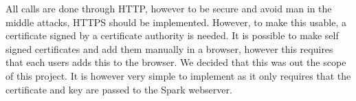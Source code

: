 \documentclass[12pt]{report}
\begin{document}
All calls are done through HTTP, however to be secure and avoid man in the middle attacks, HTTPS should be implemented. However, to make this usable, a certificate signed by a certificate authority is needed. It is possible to make self signed certificates and add them manually in a browser, however this requires that each users adds this to the browser. We decided that this was out the scope of this project. It is however very simple to implement as it only requires that the certificate and key are passed to the Spark webserver.
\end{document}
